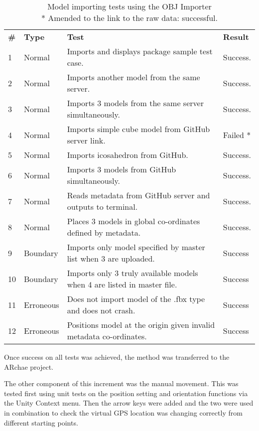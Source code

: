\documentclass[12pt, a4paper]{article}
\begin{document}
\begin{table}[H]
\footnotesize
\begin{tabular}{llll}
\textbf{\#} & \textbf{Type} & \textbf{Test}                                               & \textbf{Result} \\
1          & Normal        & Imports and displays package sample test case.              & Success.        \\
2          & Normal        & Imports another model from the same server.                 & Success.        \\
3          & Normal        & Imports 3 models from the same server simultaneously.       & Success.        \\
4  & Normal    & Imports simple cube model from GitHub server link.                      & Failed * \\
5          & Normal        & Imports icosahedron from GitHub.                            & Success.        \\
6          & Normal        & Imports 3 models from GitHub simultaneously.                & Success.        \\
7          & Normal        & Reads metadata from GitHub server and outputs to terminal.  & Success.        \\
8          & Normal        & Places 3 models in global co-ordinates defined by metadata. & Success.        \\
9          & Boundary      & Imports only model specified by master list when 3 are uploaded.   & Success         \\
10 & Boundary  & Imports only 3 truly available models when 4 are listed in master file. & Success                                                           \\
11         & Erroneous     & Does not import model of the .fbx type and does not crash.  & Success         \\
12 & Erroneous & Positions model at the origin given invalid metadata co-ordinates.      & Success 
\end{tabular}
\caption{Model importing tests using the OBJ Importer \\ * Amended to the link to the raw data: successful.}
\label{table:increment1tests}
\end{table}

Once success on all tests was achieved, the method was transferred to the ARchae project. 

The other component of this increment was the manual movement. This was tested first using unit tests on the position setting and orientation functions via the Unity Context menu. Then the arrow keys were added and the two were used in combination to check the virtual GPS location was changing correctly from different starting points.
\end{document}
